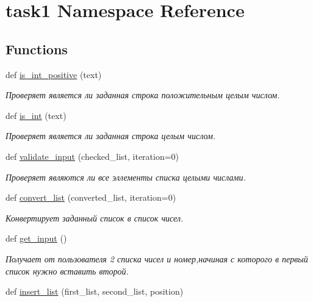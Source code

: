 \hypertarget{namespacetask1}{}\section{task1 Namespace Reference}
\label{namespacetask1}
\subsection*{Functions}
\begin{DoxyCompactItemize}
\item 
def \hyperlink{namespacetask1_a69c4434b737c41694f1d2aee91ba895b}{is\+\_\+int\+\_\+positive} (text)
\begin{DoxyCompactList}\small\item\em Проверяет является ли заданная строка положительным целым числом. \end{DoxyCompactList}\item 
def \hyperlink{namespacetask1_a5681de20db91056d4c1f98c9f2779185}{is\+\_\+int} (text)
\begin{DoxyCompactList}\small\item\em Проверяет является ли заданная строка целым числом. \end{DoxyCompactList}\item 
def \hyperlink{namespacetask1_a10a53eb0c0749f366289a43db9ce833f}{validate\+\_\+input} (checked\+\_\+list, iteration=0)
\begin{DoxyCompactList}\small\item\em Проверяет являются ли все эллементы списка целыми числами. \end{DoxyCompactList}\item 
def \hyperlink{namespacetask1_a06a145e81c9e92a7ea7a34f0dbc3f564}{convert\+\_\+list} (converted\+\_\+list, iteration=0)
\begin{DoxyCompactList}\small\item\em Конвертирует заданный список в список чисел. \end{DoxyCompactList}\item 
def \hyperlink{namespacetask1_a5480bbc141bb9daea9115381cf91f976}{get\+\_\+input} ()
\begin{DoxyCompactList}\small\item\em Получает от пользователя 2 списка чисел и номер,начиная с которого в первый список нужно вставить второй. \end{DoxyCompactList}\item 
def \hyperlink{namespacetask1_ab3265af060c8bf16468def7fbbbc9b3e}{insert\+\_\+list} (first\+\_\+list, second\+\_\+list, position)

\end{DoxyCompactItemize}

